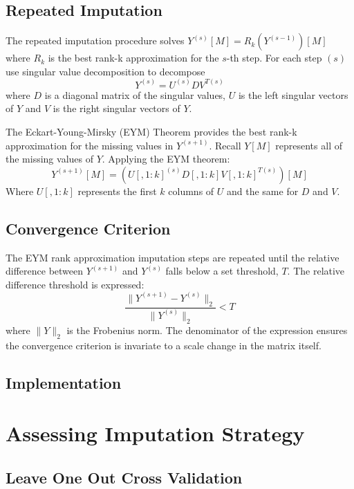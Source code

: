 \documentclass[12pt,twoside]{dukestatscithesis}
\theoremstyle{definition}
\theoremstyle{definition}
\theoremstyle{definition}
\theoremstyle{remark}
\begin{document}
\subsection{Repeated Imputation}\label{repeated-imputation}

The repeated imputation procedure solves
\(Y^{(s)}[M] = R_k(Y^{(s-1)})[M]\) where \(R_k\) is the best rank-k
approximation for the \(s\)-th step. For each step \((s)\) use singular
value decomposition to decompose \[Y^{(s)} =  U^{(s)}DV^{T(s)}\] where
\(D\) is a diagonal matrix of the singular values, \(U\) is the left
singular vectors of \(Y\) and \(V\) is the right singular vectors of
\(Y\).

The Eckart-Young-Mirsky (EYM) Theorem provides the best rank-k
approximation for the missing values in \(Y^{(s+1)}\). Recall \(Y[M]\)
represents all of the missing values of \(Y\). Applying the EYM theorem:
\[Y^{(s+1)}[M] = (U[,1:k]^{(s)}D[,1:k]V[,1:k]^{T(s)})[M]\] Where
\(U[,1:k]\) represents the first \(k\) columns of \(U\) and the same for
\(D\) and \(V\).

\subsection{Convergence Criterion}\label{convergence-criterion}

The EYM rank approximation imputation steps are repeated until the
relative difference between \(Y^{(s+1)}\) and \(Y^{(s)}\) falls below a
set threshold, \(T\). The relative difference threshold is expressed:
\[\frac{\|Y^{(s+1)}-Y^{(s)}\|_2}{\|Y^{(s)}\|_2} < T\] where \(\|Y\|_2\)
is the Frobenius norm. The denominator of the expression ensures the
convergence criterion is invariate to a scale change in the matrix
itself.

\subsection{Implementation}\label{implementation}

\section{Assessing Imputation
Strategy}\label{assessing-imputation-strategy}

\subsection{Leave One Out Cross
Validation}\label{leave-one-out-cross-validation}
\end{document}
